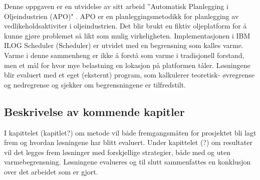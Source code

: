 Denne oppgaven er en utvidelse av \bht sitt arbeid ''Automatisk Planlegging i Oljeindustrien (APO)" \cite{tvedtbezem}. APO er en planleggingsmetodikk for planlegging av vedlikeholdsaktiviter i oljeindustrien. Det blir brukt en fiktiv oljeplatform for å kunne gjøre problemet så likt som mulig virkeligheten. Implementasjonen i IBM ILOG Scheduler (Scheduler) er utvidet med en begrensning som kalles varme. Varme i denne sammenheng er ikke å forstå som varme i tradisjonell forstand, men et mål for hvor mye belastning en lokasjon på platformen tåler. Løsningene blir evaluert med et eget (eksternt) program, som kalkulerer teoretisk- øvregrense og nedregrense og sjekker om begrensningene er tilfredstilt.

\subsection{Beskrivelse av kommende kapitler}
I kapittelet (kapitlet?) om metode vil både fremgangsmåten for prosjektet bli lagt frem og hvordan løsningene har blitt evaluert. Under kapittelet (?) om resultater vil det legges frem løsninger med forskjellige strategier, både med og uten varmebegrensning. Løsningene evalueres og til slutt sammenfattes en konklusjon over det arbeidet som er gjort.